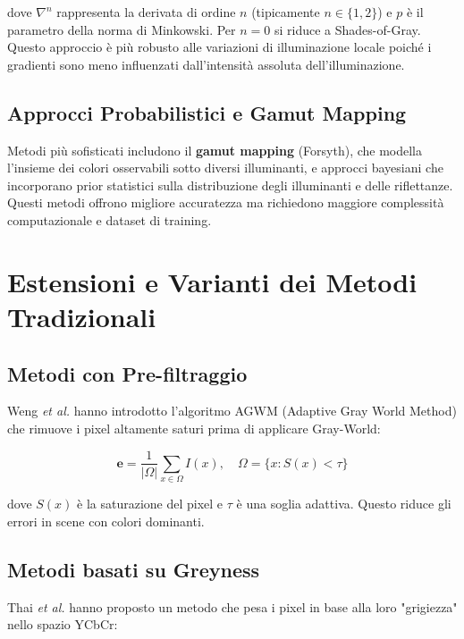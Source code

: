 dove $\nabla^n$ rappresenta la derivata di ordine $n$ (tipicamente $n \in \{1, 2\}$) e $p$ è il parametro della norma di Minkowski. Per $n = 0$ si riduce a Shades-of-Gray. Questo approccio è più robusto alle variazioni di illuminazione locale poiché i gradienti sono meno influenzati dall'intensità assoluta dell'illuminazione.

\subsection{Approcci Probabilistici e Gamut Mapping}

Metodi più sofisticati includono il \textbf{gamut mapping} (Forsyth), che modella l'insieme dei colori osservabili sotto diversi illuminanti, e approcci bayesiani \cite{gehler_bayesian_2008} che incorporano prior statistici sulla distribuzione degli illuminanti e delle riflettanze. Questi metodi offrono migliore accuratezza ma richiedono maggiore complessità computazionale e dataset di training.

\section{Estensioni e Varianti dei Metodi Tradizionali}

\subsection{Metodi con Pre-filtraggio}

Weng \textit{et al.} \cite{weng_novel_2005} hanno introdotto l'algoritmo AGWM (Adaptive Gray World Method) che rimuove i pixel altamente saturi prima di applicare Gray-World:

\begin{equation}
\mathbf{e} = \frac{1}{|\Omega|} \sum_{x \in \Omega} I(x), \quad \Omega = \{x : S(x) < \tau\}
\end{equation}

dove $S(x)$ è la saturazione del pixel e $\tau$ è una soglia adattiva. Questo riduce gli errori in scene con colori dominanti.

\subsection{Metodi basati su Greyness}

Thai \textit{et al.} \cite{thai_fast_2016} hanno proposto un metodo che pesa i pixel in base alla loro "grigiezza" nello spazio YCbCr:

